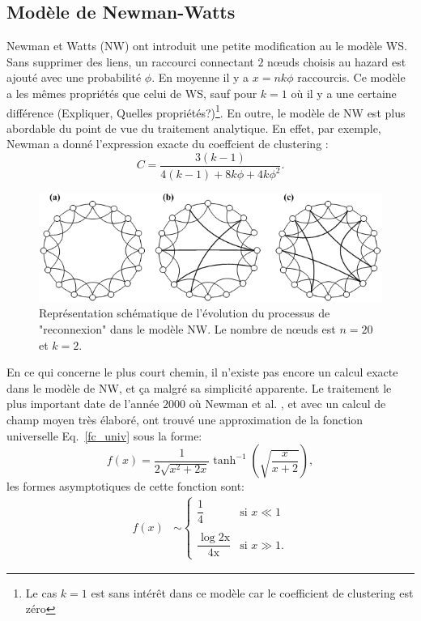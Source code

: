 \subsection{Modèle de Newman-Watts}
Newman et Watts (NW) \cite{Newman-Watts1999} ont introduit une petite modification au le modèle WS. Sans supprimer des liens, un raccourci connectant $2$ nœuds choisis au hazard est ajouté avec une probabilité $\phi$. En moyenne il y a $x=nk\phi$ raccourcis. Ce modèle a les m\^{e}mes propriétés que celui de WS, sauf pour $k=1$ où il y a une certaine différence (Expliquer, Quelles propriétés?)\footnote{Le cas $k=1$ est sans intérêt dans ce modèle car le coefficient de clustering est zéro}. En outre, le modèle de NW est plus abordable du point de vue du traitement analytique. En effet, par exemple, Newman a donné l'expression exacte du coeffcient de clustering \cite{Newman2010}:
\begin{equation}
C=\frac{3(k-1)}{4(k-1)+8k\phi+4k\phi^2}.
\end{equation}
	\begin{figure}[h!]
		\centering
		\includegraphics[scale=0.55]{./figures/fig-NW}
		\caption{Représentation schématique de l'évolution du processus de "reconnexion" dans le modèle NW.  Le nombre de nœuds est $n=20$ et $k=2$.}  	
		\label{NW}
	\end{figure}
En ce qui concerne le plus court chemin, il n'existe pas encore un calcul exacte dans le modèle de NW, et ça malgré sa simplicité apparente. Le traitement le plus important date de l'année $2000$ où Newman et al. \cite{Newman-al2000}, et avec un calcul de champ moyen très élaboré, ont trouvé une approximation de la fonction universelle Eq.~\eqref{fc_univ} sous la forme:
\begin{equation}
f(x)=\frac{1}{2\sqrt{x^2+2x}}\tanh^{-1}(\sqrt{\frac{x}{x+2}}),\label{eq-ws}
\end{equation}
les formes asymptotiques de cette fonction sont: 
\begin{align}
f(x)&\sim
\begin{cases}
\dfrac{1}{4} & \text{si } x \ll1\\
\\
\dfrac{\log\mathrm{2x}}{\mathrm{4x}}& \text{si } x \gg1.
\end{cases}
\end{align}
